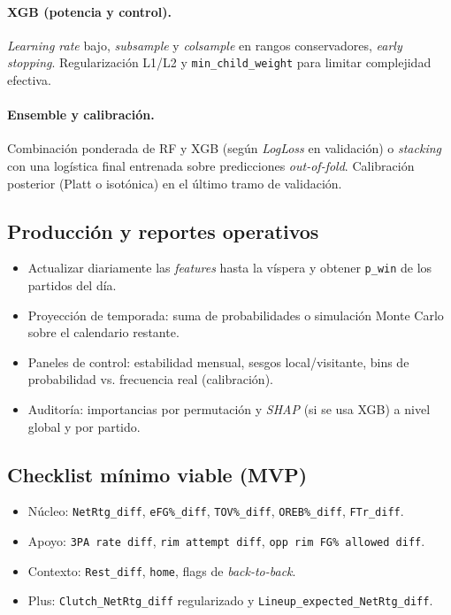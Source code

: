 \paragraph{XGB (potencia y control).}
\textit{Learning rate} bajo, \textit{subsample} y \textit{colsample} en rangos conservadores, \textit{early stopping}.
Regularización L1/L2 y \texttt{min\_child\_weight} para limitar complejidad efectiva.

\paragraph{Ensemble y calibración.}
Combinación ponderada de RF y XGB (según \textit{LogLoss} en validación) o \textit{stacking} con una logística final entrenada sobre predicciones \textit{out-of-fold}.
Calibración posterior (Platt o isotónica) en el último tramo de validación.

\subsection{Producción y reportes operativos}
\begin{itemize}
  \item Actualizar diariamente las \textit{features} hasta la víspera y obtener \texttt{p\_win} de los partidos del día.
  \item Proyección de temporada: suma de probabilidades o simulación Monte Carlo sobre el calendario restante.
  \item Paneles de control: estabilidad mensual, sesgos local/visitante, bins de probabilidad vs. frecuencia real (calibración).
  \item Auditoría: importancias por permutación y \textit{SHAP} (si se usa XGB) a nivel global y por partido.
\end{itemize}

\subsection{Checklist mínimo viable (MVP)}
\begin{itemize}
  \item Núcleo: \texttt{NetRtg\_diff}, \texttt{eFG\%\_diff}, \texttt{TOV\%\_diff}, \texttt{OREB\%\_diff}, \texttt{FTr\_diff}.
  \item Apoyo: \texttt{3PA rate diff}, \texttt{rim attempt diff}, \texttt{opp rim FG\% allowed diff}.
  \item Contexto: \texttt{Rest\_diff}, \texttt{home}, flags de \textit{back-to-back}.
  \item Plus: \texttt{Clutch\_NetRtg\_diff} regularizado y \texttt{Lineup\_expected\_NetRtg\_diff}.
\end{itemize}

